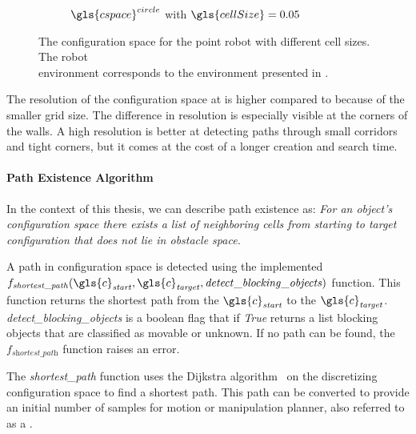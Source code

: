 \begin{figure}[H]
\begin{subfigure}{.49\textwidth}
    \caption{$\gls{cspace}^{circle}$ with $\gls{cellSize} = 0.05$}%
    \label{fig:c_space_two_pushes_smaller}
  \end{subfigure}
  \caption{The configuration space for the point robot with different cell sizes. The robot\\environment corresponds to the environment presented in .}
  \label{fig:two_pushes_to_freedom_conf_space}
\end{figure}


The resolution of the configuration space at  is higher compared to  because of the smaller grid size. The difference in resolution is especially visible at the corners of the walls. A high resolution is better at detecting paths through small corridors and tight corners, but it comes at the cost of a longer creation and search time.

\paragraph{Path Existence Algorithm} In the context of this thesis, we can describe path existence as: \textit{For an object's configuration space there exists a list of neighboring cells from starting to target configuration that does not lie in obstacle space.\bs}

A path in configuration space is detected using the implemented\\$f_\mathit{shortest\_path}(\gls{c}_\mathit{start}, \gls{c}_\mathit{target}, \mathit{detect\_blocking\_objects})$ function. This function returns the shortest path from the $\gls{c}_\mathit{start}$ to the $\gls{c}_\mathit{target}$. \textit{detect\_blocking\_objects} is a boolean flag that if \textit{True} returns a list blocking objects that are classified as movable or unknown. If no path can be found, the $f_\textit{shortest\_path}$ function raises an error.\bs

The \textit{shortest\_path} function uses the Dijkstra algorithm~\cite{dijkstra_note_1959} on the discretizing configuration space to find a shortest path. This path can be converted to provide an initial number of samples for motion or manipulation planner, also referred to as a .\bs

